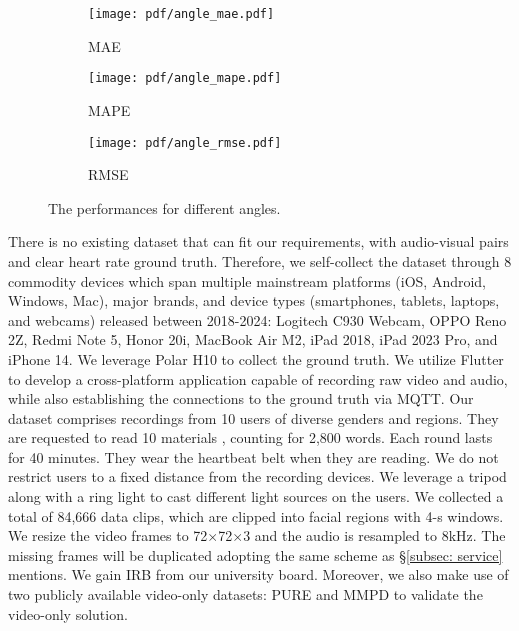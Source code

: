 \begin{figure*}[t]
    \centering
    \begin{minipage}{\linewidth}
        \begin{subfigure}{.32\linewidth}
            \texttt{[image: pdf/angle\_mae.pdf]}
            \caption{MAE}
            \label{subfig:angle_mae}
        \end{subfigure}\hfill
        \begin{subfigure}{.32\linewidth}
            \texttt{[image: pdf/angle\_mape.pdf]}
            \caption{MAPE}
            \label{subfig:angle_mape}
        \end{subfigure}\hfill
        \begin{subfigure}{.32\linewidth}
            \texttt{[image: pdf/angle\_rmse.pdf]}
            \caption{RMSE}
            \label{subfig:angle_rmse}
        \end{subfigure}
    \end{minipage}
    \caption{The performances for different angles.}
    \label{fig: res_angle}
\end{figure*}

 There is no existing dataset that can fit our requirements, with audio-visual pairs and clear heart rate ground truth. Therefore, we self-collect the dataset through 8 commodity devices which span multiple mainstream platforms (iOS, Android, Windows, Mac), major brands, and device types (smartphones, tablets, laptops, and webcams) released between 2018-2024:  Logitech C930 Webcam, OPPO Reno 2Z, Redmi Note 5, Honor 20i, MacBook Air M2, iPad 2018, iPad 2023 Pro, and iPhone 14. We leverage Polar H10 \cite{PolarH10Polar} to collect the ground truth. We utilize Flutter to develop a cross-platform application capable of recording raw video and audio, while also establishing the connections to the ground truth via MQTT. Our dataset comprises recordings from 10 users of diverse genders and regions. They are requested to read 10 materials \cite{sun2021ultrase}, counting for 2,800 words. Each round lasts for 40 minutes. They wear the heartbeat belt when they are reading. We do not restrict users to a fixed distance from the recording devices. We leverage a tripod along with a ring light to cast different light sources on the users. We collected a total of 84,666 data clips, which are clipped into facial regions with 4-s windows. We resize the video frames to 72$\times$72$\times$3 and the audio is resampled to 8kHz. The missing frames will be duplicated adopting the same scheme as \S\ref{subsec: service} mentions. We gain IRB from our university board. Moreover, we also make use of two publicly available video-only datasets: PURE \cite{stricker2014non} and MMPD \cite{10340857} to validate the video-only solution.

